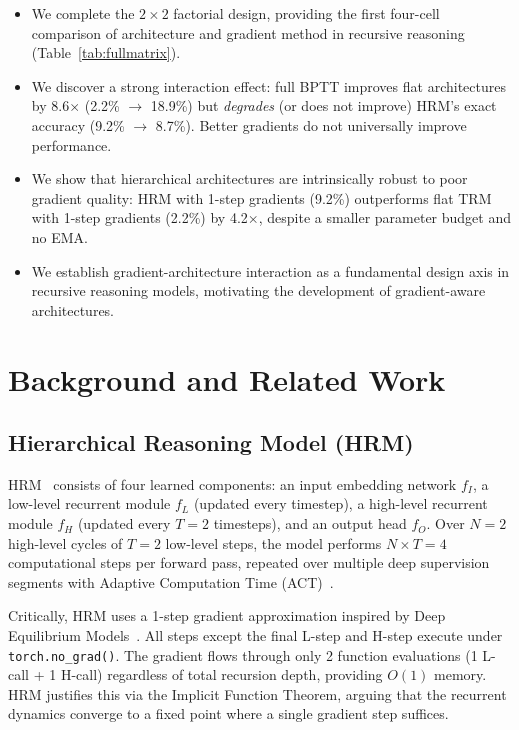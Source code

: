 \documentclass{article}
\begin{document}
\begin{itemize}
    \item We complete the $2\times2$ factorial design, providing the first four-cell comparison of architecture and gradient method in recursive reasoning (Table~\ref{tab:fullmatrix}).
    \item We discover a strong interaction effect: full BPTT improves flat architectures by 8.6$\times$ (2.2\% $\rightarrow$ 18.9\%) but \emph{degrades} (or does not improve) HRM's exact accuracy (9.2\% $\rightarrow$ 8.7\%). Better gradients do not universally improve performance.
    \item We show that hierarchical architectures are intrinsically robust to poor gradient quality: HRM with 1-step gradients (9.2\%) outperforms flat TRM with 1-step gradients (2.2\%) by 4.2$\times$, despite a smaller parameter budget and no EMA.
    \item We establish gradient-architecture interaction as a fundamental design axis in recursive reasoning models, motivating the development of gradient-aware architectures.
\end{itemize}

\section{Background and Related Work}

\subsection{Hierarchical Reasoning Model (HRM)}

HRM~\cite{wang2025hrm} consists of four learned components: an input embedding network $f_I$, a low-level recurrent module $f_L$ (updated every timestep), a high-level recurrent module $f_H$ (updated every $T=2$ timesteps), and an output head $f_O$. Over $N=2$ high-level cycles of $T=2$ low-level steps, the model performs $N\times T=4$ computational steps per forward pass, repeated over multiple deep supervision segments with Adaptive Computation Time (ACT)~\cite{graves2016act}.

Critically, HRM uses a 1-step gradient approximation inspired by Deep Equilibrium Models~\cite{bai2019deq}. All steps except the final L-step and H-step execute under \texttt{torch.no\_grad()}. The gradient flows through only 2 function evaluations (1 L-call + 1 H-call) regardless of total recursion depth, providing $O(1)$ memory. HRM justifies this via the Implicit Function Theorem, arguing that the recurrent dynamics converge to a fixed point where a single gradient step suffices.
\end{document}
